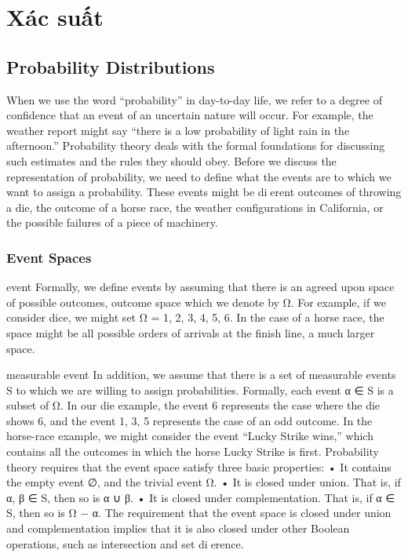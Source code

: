 \chapter{Xác suất}


\section{Probability Distributions}

When we use the word “probability” in day-to-day life, we refer to a degree of confidence that an event of an uncertain nature will occur. For example, the weather report might say “there is a low probability of light rain in the afternoon.” Probability theory deals with the formal foundations for discussing such estimates and the rules they should obey. Before we discuss the representation of probability, we need to define what the events are to which we want to assign a probability. These events might be dierent outcomes of throwing a die, the outcome of a horse race, the weather configurations in California, or the possible failures of a piece of machinery.

\subsection{Event Spaces}

event Formally, we define events by assuming that there is an agreed upon space of possible outcomes, outcome space which we denote by Ω. For example, if we consider dice, we might set Ω = {1, 2, 3, 4, 5, 6}. In the case of a horse race, the space might be all possible orders of arrivals at the finish line, a much larger space.

measurable event In addition, we assume that there is a set of measurable events S to which we are willing to assign probabilities. Formally, each event α ∈ S is a subset of Ω. In our die example, the event {6} represents the case where the die shows 6, and the event {1, 3, 5} represents the case of an odd outcome. In the horse-race example, we might consider the event “Lucky Strike wins,” which contains all the outcomes in which the horse Lucky Strike is first. Probability theory requires that the event space satisfy three basic properties: • It contains the empty event ∅, and the trivial event Ω. • It is closed under union. That is, if α, β ∈ S, then so is α ∪ β. • It is closed under complementation. That is, if α ∈ S, then so is Ω − α. The requirement that the event space is closed under union and complementation implies that it is also closed under other Boolean operations, such as intersection and set dierence.

